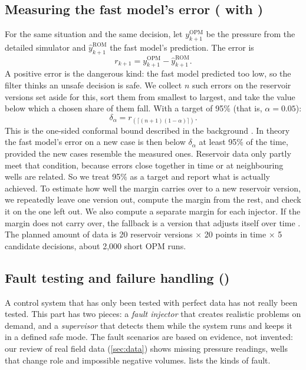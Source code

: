 \documentclass[11pt,letterpaper]{article}
\begin{document}
\subsection{Measuring the fast model's error (\IsmaelS{} with \AzizS)}

For the same situation and the same decision, let $y^{\mathrm{OPM}}_{k+1}$ be the pressure
from the detailed simulator and $\hat y^{\mathrm{ROM}}_{k+1}$ the fast model's prediction.
The error is
\begin{equation}\label{eq:res}
r_{k+1} = y^{\mathrm{OPM}}_{k+1} - \hat y^{\mathrm{ROM}}_{k+1}.
\end{equation}
A positive error is the dangerous kind: the fast model predicted too low, so the filter
thinks an unsafe decision is safe. We collect $n$ such errors on the reservoir versions set
aside for this, sort them from smallest to largest, and take the value below which a chosen
share of them fall. With a target of 95\% (that is, $\alpha=0.05$):
\begin{equation}\label{eq:margin}
\delta_\alpha = r_{(\lceil (n+1)(1-\alpha)\rceil)} .
\end{equation}
This is the one-sided conformal bound described in the background
\cite{lei2018conformal}. In theory the fast model's error on a new case is then below
$\delta_\alpha$ at least 95\% of the time, provided the new cases resemble the measured
ones. Reservoir data only partly meet that condition, because errors close together in time
or at neighbouring wells are related. So we treat 95\% as a target and report what is
actually achieved. To estimate how well the margin carries over to a new reservoir version,
we repeatedly leave one version out, compute the margin from the rest, and check it on the
one left out. We also compute a separate margin for each injector. If the margin does not
carry over, the fallback is a version that adjusts itself over time \cite{gibbs2021aci}.
The planned amount of data is 20 reservoir versions $\times$ 20 points in time $\times$ 5
candidate decisions, about 2,000 short OPM runs.

\subsection{Fault testing and failure handling (\TimurS)}

A control system that has only been tested with perfect data has not really been tested.
This part has two pieces: a \emph{fault injector} that creates realistic problems on
demand, and a \emph{supervisor} that detects them while the system runs and keeps it in a
defined safe mode. The fault scenarios are based on evidence, not invented: our review of
real field data (\cref{sec:data}) shows missing pressure readings, wells that change role
and impossible negative volumes.  lists the kinds of fault.
\end{document}
